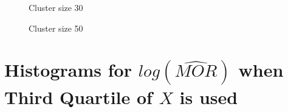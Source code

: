 \documentclass[
  letterpaper,
  DIV=11,
  numbers=noendperiod,
  titlepage]{scrartcl}
\begin{document}
\begin{figure}
\begin{minipage}[t]{0.24\linewidth}
{{}

\caption{Cluster size 30}

}

\end{minipage}%
%
\begin{minipage}[t]{0.24\linewidth}

{\centering 


\caption{Cluster size 50}

}

\end{minipage}%

\end{figure}

\newpage

\hypertarget{histograms-for-logwidehatmor-when-third-quartile-of-x-is-used}{%
\section{\texorpdfstring{Histograms for \(log(\widehat{MOR})\) when
Third Quartile of \(X\) is
used}{Histograms for log(\textbackslash widehat\{MOR\}) when Third Quartile of X is used}}\label{histograms-for-logwidehatmor-when-third-quartile-of-x-is-used}}
\end{document}
